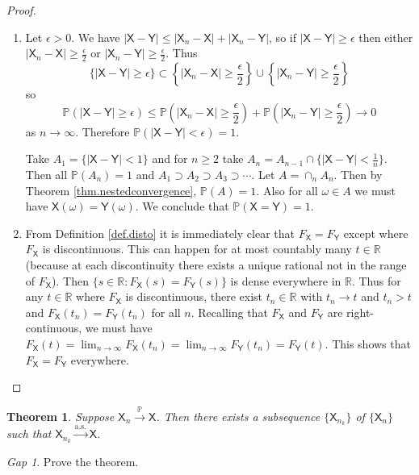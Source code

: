 \documentclass[11pt]{article}
\newcommand{\rv}[1]{\mathsf{#1}}
\newcommand{\p}{\mathbb{P}}
\newcommand{\asto}{\xrightarrow{\text{a.s.}}}
\newcommand{\pto}{\xrightarrow{\p}}
\newcommand{\RR}{\mathbb{R}}
\theoremstyle{theorem}
\newtheorem{theorem}{Theorem}[section]
\theoremstyle{definition}
\theoremstyle{remark}
\theoremstyle{step}
\theoremstyle{gap}
\newtheorem*{gap}{Gap}
\begin{document}
\begin{proof}\ 
\begin{enumerate}
\item
Let \(\epsilon > 0\).
We have \(|\rv{X}-\rv{Y}| \leq |\rv{X}_n-\rv{X}| + |\rv{X}_n - \rv{Y}|\), so if \(|\rv{X}-\rv{Y}|\geq \epsilon\) then either \(|\rv{X}_n - \rv{X}| \geq \frac{\epsilon}{2}\) or \(|\rv{X}_n - \rv{Y}| \geq \frac{\epsilon}{2}\). Thus \[\{|\rv{X}-\rv{Y}|\geq \epsilon\} \subset \left\{|\rv{X}_n-\rv{X}| \geq \frac{\epsilon}{2}\right\} \cup \left\{|\rv{X}_n - \rv{Y}| \geq \frac{\epsilon}{2}\right\}\]
so
\[\p(|\rv{X}-\rv{Y}|\geq \epsilon) \leq \p\left(|\rv{X}_n-\rv{X}| \geq \frac{\epsilon}{2}\right) + \p\left(|\rv{X}_n - \rv{Y}| \geq \frac{\epsilon}{2}\right) \to 0\]
as \(n \to \infty\). Therefore \(\p(|\rv{X}-\rv{Y}| < \epsilon) = 1\).

Take \(A_1 = \{|\rv{X}-\rv{Y}| < 1\}\) and for \(n \geq 2\) take \(A_n = A_{n-1} \cap \{|\rv{X}-\rv{Y}| < \frac{1}{n}\}\). Then all \(\p(A_n) = 1\) and \(A_1 \supset A_2 \supset A_3 \supset \cdots\). Let \(A = \cap_n A_n\). Then by Theorem \ref{thm.nestedconvergence}, \(\p(A) = 1\). Also for all \(\omega \in A\) we must have \(\rv{X}(\omega) = \rv{Y}(\omega)\). We conclude that \(\p(\rv{X}=\rv{Y}) = 1\).

\item
From Definition \ref{def.disto} it is immediately clear that \(F_\rv{X} = F_\rv{Y}\) except where \(F_\rv{X}\) is discontinuous. This can happen for at most countably many \(t \in \RR\) (because at each discontinuity there exists a unique rational not in the range of \(F_\rv{X}\)). Then \(\{s \in \RR:F_\rv{X}(s) = F_\rv{Y}(s)\}\) is dense everywhere in \(\RR\). Thus for any \(t\in\RR\) where \(F_\rv{X}\) is discontinuous, there exist \(t_n\in \RR\) with \(t_n \to t\) and \(t_n > t\) and \(F_\rv{X}(t_n) = F_\rv{Y}(t_n)\) for all \(n\). Recalling that \(F_\rv{X}\) and \(F_\rv{Y}\) are right-continuous, we must have \(F_\rv{X}(t) = \lim_{n \to \infty} F_\rv{X}(t_n) = \lim_{n \to \infty} F_\rv{Y}(t_n) = F_\rv{Y}(t) \). This shows that \(F_\rv{X} = F_\rv{Y}\) everywhere.
\end{enumerate}
\end{proof}

\begin{theorem}
Suppose \(\rv{X}_n \pto \rv{X}\). Then there exists a subsequence \(\{\rv{X}_{n_k}\}\) of \(\{\rv{X}_n\}\) such that \(\rv{X}_{n_k} \asto \rv{X}\).
\end{theorem}

\begin{gap}
Prove the theorem.
\end{gap}
\end{document}

